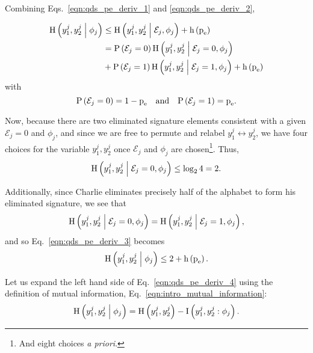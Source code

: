 Combining Eqs.~\ref{eqn:qds_pe_deriv_1} and \ref{eqn:qds_pe_deriv_2},

\begin{align}\label{eqn:qds_pe_deriv_3}
\text{H}\left(y_1^j, y_2^j \; \middle| \; \phi_j\right) &\le \text{H}\left(y_1^j, y_2^j \; \middle| \; \mathcal{E}_j, \phi_j\right) + \text{h}\left(\text{p}_{\text{e}}\right) \notag \\
&= \text{P}\left(\mathcal{E}_j=0\right) \text{H}\left(y_1^j, y_2^j \; \middle| \; \mathcal{E}_j=0, \phi_j\right) \notag \\
&+ \text{P}\left(\mathcal{E}_j=1\right) \text{H}\left(y_1^j, y_2^j \; \middle| \; \mathcal{E}_j=1, \phi_j\right) + \text{h}\left(\text{p}_{\text{e}}\right)
\end{align}
with
\begin{equation}
\text{P}\left(\mathcal{E}_j=0\right) = 1 - \pe \qq{and} \text{P}\left(\mathcal{E}_j=1\right) = \pe.
\end{equation}

\noindent Now, because there are two eliminated signature elements consistent with a given $\mathcal{E}_j=0$ and $\phi_j$, and since we are free to permute and relabel $y_1^j \leftrightarrow y_2^j$, we have four choices for the variable $y_1^j, y_2^j$ once $\mathcal{E}_j$ and $\phi_j$ are chosen\footnote{And eight choices \emph{a priori}.}. Thus,
\begin{equation}
\text{H}\left(y_1^j, y_2^j \; \middle| \; \mathcal{E}_j=0, \phi_j\right) \le \log_2 4 = 2.
\end{equation}

\noindent Additionally, since Charlie eliminates precisely half of the alphabet to form his eliminated signature, we see that
\begin{equation}
\text{H}\left(y_1^j, y_2^j \; \middle| \; \mathcal{E}_j=0, \phi_j\right) = \text{H}\left(y_1^j, y_2^j \; \middle| \; \mathcal{E}_j=1, \phi_j\right),
\end{equation}
and so Eq.~\ref{eqn:qds_pe_deriv_3} becomes
\begin{equation}\label{eqn:qds_pe_deriv_4}
\text{H}\left(y_1^j, y_2^j \; \middle| \; \phi_j\right) \le 2 + \text{h}\left(\text{p}_{\text{e}}\right).
\end{equation}

\noindent Let us expand the left hand side of Eq.~\ref{eqn:qds_pe_deriv_4} using the definition of mutual information, Eq.~\ref{eqn:intro_mutual_information}:
\begin{equation}\label{eqn:qds_pe_deriv_5}
\text{H}\left(y_1^j, y_2^j \; \middle| \; \phi_j\right) = \text{H}\left(y_1^j, y_2^j\right) - \text{I}\left(y_1^j, y_2^j : \phi_j\right).
\end{equation}

